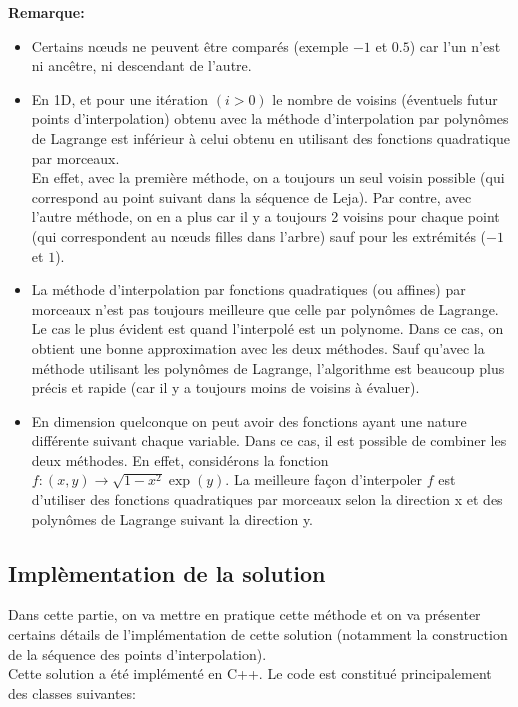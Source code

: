 \textbf{Remarque:}
\begin{itemize}
\item Certains nœuds ne peuvent être comparés (exemple $-1$ et $0.5$) car l'un n'est ni ancêtre, ni descendant de l'autre.\\
\item En 1D, et pour une itération $(i>0)$ le nombre de voisins (éventuels futur points d'interpolation) obtenu avec la méthode d'interpolation par polynômes de Lagrange est inférieur
à celui obtenu en utilisant des fonctions quadratique par morceaux. \\
En effet, avec la première méthode, on a toujours un seul voisin possible (qui correspond au point suivant dans la séquence de Leja).
Par contre, avec l'autre méthode, on en a plus car il y a toujours 2 voisins pour chaque point (qui correspondent au nœuds filles dans l'arbre) sauf pour les extrémités ($-1$ et $1$).
\item La méthode d'interpolation par fonctions quadratiques (ou affines) par morceaux n'est pas toujours meilleure que celle par polynômes de Lagrange.
Le cas le plus évident est quand l'interpolé est un polynome. Dans ce cas, on obtient une bonne approximation avec les deux méthodes.
Sauf qu'avec la méthode utilisant les polynômes de Lagrange, l'algorithme est beaucoup plus précis et rapide (car il y a toujours moins de voisins à évaluer).
\item En dimension quelconque on peut avoir des fonctions ayant une nature différente suivant chaque variable. Dans ce cas, il est possible de combiner les deux méthodes.
En effet, considérons la fonction $f : (x,y) \rightarrow \sqrt{1-x^2}\exp(y)$.
La meilleure façon d'interpoler $f$ est d'utiliser des fonctions quadratiques par morceaux selon la direction x et des polynômes de Lagrange suivant la direction y.
\end{itemize}



\subsection{Implèmentation de la solution}\label{sec:5}
Dans cette partie, on va mettre en pratique cette méthode et on va présenter certains détails
de l'implémentation de cette solution (notamment la construction de la séquence des points d'interpolation).\\
Cette solution a été implémenté en C++. Le code est constitué principalement des classes suivantes:


